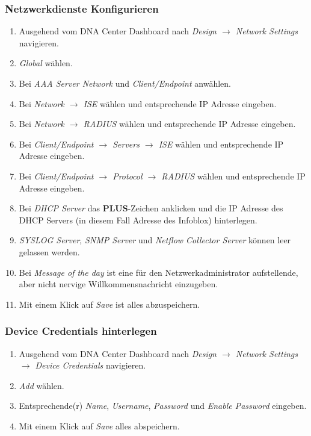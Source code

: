 \subsubsection{Netzwerkdienste Konfigurieren}
\begin{enumerate}
	\item Ausgehend vom DNA Center Dashboard nach \textit{Design $\rightarrow$ Network Settings} navigieren. 
	\item \textit{Global} wählen. 
	\item Bei \textit{AAA Server Network} und \textit{Client/Endpoint} anwählen.
	\item Bei \textit{Network $\rightarrow$ ISE} wählen und entsprechende IP Adresse eingeben.
	\item Bei \textit{Network $\rightarrow$ RADIUS} wählen und entsprechende IP Adresse eingeben.
	\item Bei \textit{Client/Endpoint $\rightarrow$ Servers $\rightarrow$ ISE} wählen und entsprechende IP Adresse eingeben.
	\item Bei \textit{Client/Endpoint $\rightarrow$ Protocol $\rightarrow$ RADIUS} wählen und entsprechende IP Adresse eingeben.
	\item Bei \textit{DHCP Server} das \textbf{PLUS}-Zeichen anklicken und die IP Adresse des DHCP Servers (in diesem Fall Adresse des Infoblox) hinterlegen. 
	\item \textit{SYSLOG Server}, \textit{SNMP Server} und \textit{Netflow Collector Server} können leer gelassen werden.
	\item Bei \textit{Message of the day} ist eine für den Netzwerkadministrator aufstellende, aber nicht nervige Willkommensnachricht einzugeben. 
	\item Mit einem Klick auf \textit{Save} ist alles abzuspeichern.
\end{enumerate}

\subsubsection{Device Credentials hinterlegen}
\begin{enumerate}
	\item Ausgehend vom DNA Center Dashboard nach \textit{Design $\rightarrow$ Network Settings $\rightarrow$ Device Credentials} navigieren. 
	\item \textit{Add} wählen. 
	\item Entsprechende(r) \textit{Name}, \textit{Username}, \textit{Password} und \textit{Enable Password} eingeben.
	\item Mit einem Klick auf \textit{Save} alles abspeichern.
\end{enumerate}

